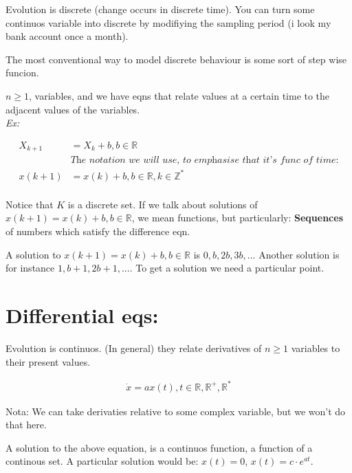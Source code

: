 \documentclass[a4paper,12pt]{article}
\begin{document}
    Evolution is discrete (change occurs in discrete time).
    You can turn some continuos variable into discrete by modifiying the sampling
    period (i look my bank account once a month).
    
    The most conventional way to model discrete behaviour is some sort of 
    step wise funcion.

    $n \geq 1$, variables, and we have eqns that relate values at a certain 
    time to the adjacent values of the variables.\\

    \textit{Ex:} 

    \begin{align*}
        X_{k+1} &= X_{k} + b, b \in \mathbb{R}\\
                &\textit{The notation we will use, to emphasise that it's func of time:}\\
        x(k+1) &= x(k)  + b, b \in \mathbb{R}, k \in \mathbb{Z}^{*}\\
    \end{align*}

    Notice that $K$ is a discrete set. 
    If we talk about solutions of $x(k+1) = x(k)  + b, b \in \mathbb{R}$, we 
    mean functions, but particularly: \textbf{Sequences} of numbers which 
    satisfy the difference eqn.

    A solution to $x(k+1) = x(k)  + b, b \in \mathbb{R}$ is $0, b, 2b, 3b, ...$
    Another solution is for instance $1, b + 1, 2b + 1, ...$. To get a solution
    we need a particular point.


    \section{Differential eqs:}

    Evolution is continuos.
    (In general) they relate derivatives of $n\geq 1$ variables to their present
    values.

    \begin{align*}
        \dot{x} = ax(t), t \in \mathbb{R}, \mathbb{R}^{+}, \mathbb{R}^{*}
    \end{align*}

    \begin{mdframed}{{\color{blue}Nota: }}
        We can take derivaties relative to some complex variable, 
        but we won't do that here.
    \end{mdframed}

    A solution to the above equation, is a continuos function, a function of
    a continous set.
    A particular solution would be: $x(t) = 0$, $x(t) = c\cdot e^{at}$.\\
\end{document}

